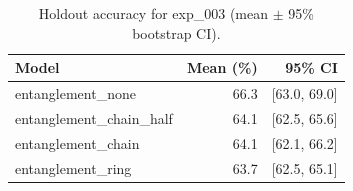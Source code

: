\begin{table}[ht]
\centering
\caption{Holdout accuracy for exp_003 (mean $\pm$ 95\% bootstrap CI).}
\label{tab:exp_003}
\begin{tabular}{lrr}
\toprule
Model & Mean (\%) & 95\% CI \\
\midrule
entanglement\_none & 66.3 & [63.0, 69.0] \\
entanglement\_chain\_half & 64.1 & [62.5, 65.6] \\
entanglement\_chain & 64.1 & [62.1, 66.2] \\
entanglement\_ring & 63.7 & [62.5, 65.1] \\
\bottomrule
\end{tabular}
\end{table}
